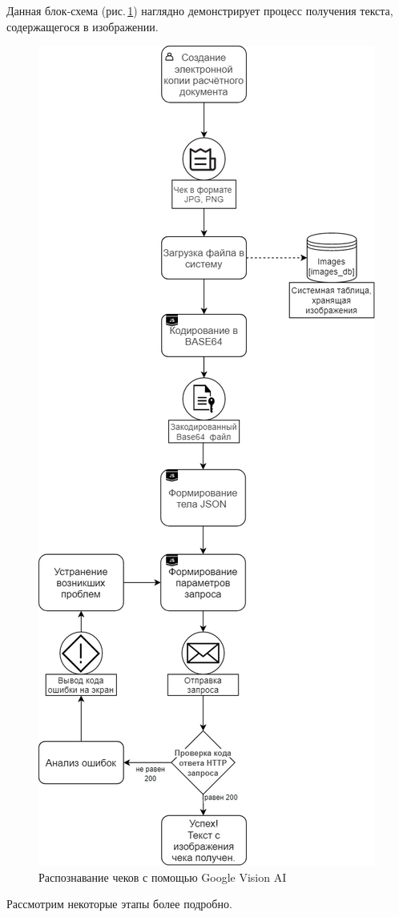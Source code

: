 \documentclass[14pt]{mmcs_article}
\begin{document}
Данная блок-схема (рис.\,\ref{stud:fig:10}) наглядно демонстрирует процесс получения текста, содержащегося в изображении. 
\begin{figure}[H]
  \centering
  \includegraphics[scale=0.5]{GAI.png}
  \caption{Распознавание чеков с помощью Google Vision AI}\label{stud:fig:10}
\end{figure}
Рассмотрим некоторые этапы более подробно.
\end{document}
